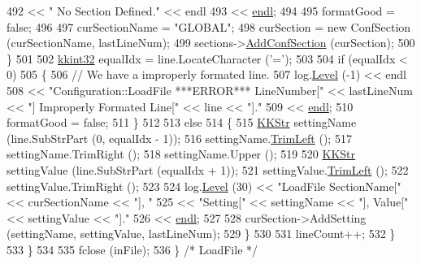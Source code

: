 \begin{DoxyCode}
492                        << \textcolor{stringliteral}{"                            No Section Defined."}  << endl 
493                        << \hyperlink{namespace_k_k_b_ad1f50f65af6adc8fa9e6f62d007818a8}{endl};
494      
495         formatGood = \textcolor{keyword}{false};
496 
497         curSectionName = \textcolor{stringliteral}{"GLOBAL"};
498         curSection = \textcolor{keyword}{new} ConfSection (curSectionName, lastLineNum);
499         sections->\hyperlink{class_k_k_b_1_1_configuration_1_1_conf_section_list_a4cb1a372299d3e5b6c306644bb465fd6}{AddConfSection} (curSection);
500       \}
501 
502       \hyperlink{namespace_k_k_b_a8fa4952cc84fda1de4bec1fbdd8d5b1b}{kkint32}  equalIdx = line.LocateCharacter (\textcolor{charliteral}{'='});
503 
504       \textcolor{keywordflow}{if}  (equalIdx < 0)
505       \{
506         \textcolor{comment}{// We have a improperly formated line.}
507         log.\hyperlink{class_k_k_b_1_1_run_log_a32cf761d7f2e747465fd80533fdbb659}{Level} (-1) << endl
508                        << \textcolor{stringliteral}{"Configuration::LoadFile   ***ERROR***   LineNumber["} << lastLineNum << \textcolor{stringliteral}{"]
       Improperly Formated Line["} << line << \textcolor{stringliteral}{"]."} 
509                        << \hyperlink{namespace_k_k_b_ad1f50f65af6adc8fa9e6f62d007818a8}{endl};
510         formatGood = \textcolor{keyword}{false};
511       \}
512 
513       \textcolor{keywordflow}{else}
514       \{
515         \hyperlink{class_k_k_b_1_1_k_k_str}{KKStr}  settingName (line.SubStrPart (0, equalIdx - 1));
516         settingName.\hyperlink{class_k_k_b_1_1_k_k_str_af7c102c53103ddff3f48270b4a198c89}{TrimLeft} ();
517         settingName.TrimRight ();
518         settingName.Upper ();
519 
520         \hyperlink{class_k_k_b_1_1_k_k_str}{KKStr}  settingValue (line.SubStrPart (equalIdx + 1));
521         settingValue.\hyperlink{class_k_k_b_1_1_k_k_str_af7c102c53103ddff3f48270b4a198c89}{TrimLeft} ();
522         settingValue.TrimRight ();
523 
524         log.\hyperlink{class_k_k_b_1_1_run_log_a32cf761d7f2e747465fd80533fdbb659}{Level} (30) << \textcolor{stringliteral}{"LoadFile   SectionName["} << curSectionName << \textcolor{stringliteral}{"], "}
525                        << \textcolor{stringliteral}{"Setting["} << settingName << \textcolor{stringliteral}{"], Value["} << settingValue   << \textcolor{stringliteral}{"]."}
526                        << \hyperlink{namespace_k_k_b_ad1f50f65af6adc8fa9e6f62d007818a8}{endl};
527 
528         curSection->AddSetting (settingName, settingValue, lastLineNum);
529       \}
530 
531       lineCount++;
532     \}
533   \}
534 
535   fclose (inFile);
536 \}  \textcolor{comment}{/* LoadFile */}
\end{DoxyCode}
